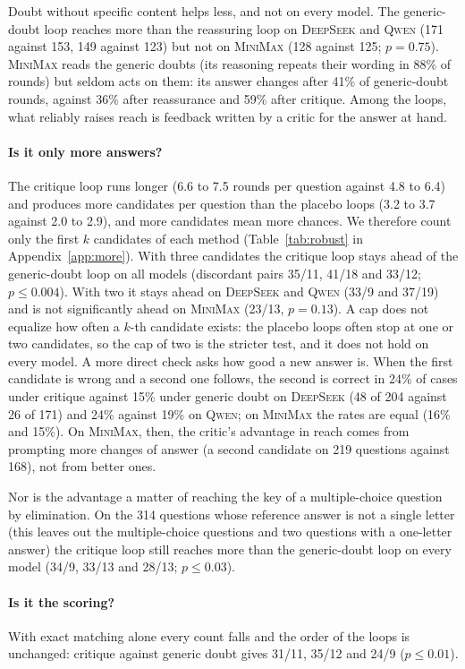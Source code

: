\documentclass[11pt]{article}
\newcommand{\ds}{\textsc{DeepSeek}}
\newcommand{\qw}{\textsc{Qwen}}
\newcommand{\mm}{\textsc{MiniMax}}
\begin{document}
Doubt without specific content helps less, and not on every model.
The generic-doubt loop reaches more than the reassuring loop on \ds{} and \qw{} (171 against 153, 149 against 123) but not on \mm{} (128 against 125; $p=0.75$).
\mm{} reads the generic doubts (its reasoning repeats their wording in 88\% of rounds) but seldom acts on them: its answer changes after 41\% of generic-doubt rounds, against 36\% after reassurance and 59\% after critique.
Among the loops, what reliably raises reach is feedback written by a critic for the answer at hand.

\paragraph{Is it only more answers?}
The critique loop runs longer (6.6 to 7.5 rounds per question against 4.8 to 6.4) and produces more candidates per question than the placebo loops (3.2 to 3.7 against 2.0 to 2.9), and more candidates mean more chances.
We therefore count only the first $k$ candidates of each method (Table~\ref{tab:robust} in Appendix~\ref{app:more}).
With three candidates the critique loop stays ahead of the generic-doubt loop on all models (discordant pairs 35/11, 41/18 and 33/12; $p\le 0.004$).
With two it stays ahead on \ds{} and \qw{} (33/9 and 37/19) and is not significantly ahead on \mm{} (23/13, $p=0.13$).
A cap does not equalize how often a $k$-th candidate exists: the placebo loops often stop at one or two candidates, so the cap of two is the stricter test, and it does not hold on every model.
A more direct check asks how good a new answer is.
When the first candidate is wrong and a second one follows, the second is correct in 24\% of cases under critique against 15\% under generic doubt on \ds{} (48 of 204 against 26 of 171) and 24\% against 19\% on \qw; on \mm{} the rates are equal (16\% and 15\%).
On \mm, then, the critic's advantage in reach comes from prompting more changes of answer (a second candidate on 219 questions against 168), not from better ones.

Nor is the advantage a matter of reaching the key of a multiple-choice question by elimination.
On the 314 questions whose reference answer is not a single letter (this leaves out the multiple-choice questions and two questions with a one-letter answer) the critique loop still reaches more than the generic-doubt loop on every model (34/9, 33/13 and 28/13; $p\le 0.03$).

\paragraph{Is it the scoring?}
With exact matching alone every count falls and the order of the loops is unchanged: critique against generic doubt gives 31/11, 35/12 and 24/9 ($p\le 0.01$).
\end{document}
